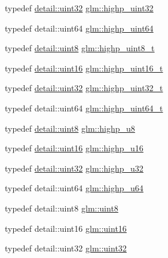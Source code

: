 \begin{DoxyCompactItemize}
\item 
typedef \hyperlink{stb__image_8c_a1134b580f8da4de94ca6b1de4d37975e}{detail\+::uint32} \hyperlink{group__gtc__type__precision_ga3145e44c73e2df7dfe4f3cb65974bf22}{glm\+::highp\+\_\+uint32}
\item 
typedef detail\+::uint64 \hyperlink{group__gtc__type__precision_ga8079c653e20cda03d34b99de629a7b09}{glm\+::highp\+\_\+uint64}
\item 
typedef \hyperlink{stb__image_8c_adde6aaee8457bee49c2a92621fe22b79}{detail\+::uint8} \hyperlink{group__gtc__type__precision_ga9ba529fcc75b82d23da979f0ce6e4518}{glm\+::highp\+\_\+uint8\+\_\+t}
\item 
typedef \hyperlink{stb__image_8c_a05f6b0ae8f6a6e135b0e290c25fe0e4e}{detail\+::uint16} \hyperlink{group__gtc__type__precision_ga3145bc0ee80432c165e985a188a722b3}{glm\+::highp\+\_\+uint16\+\_\+t}
\item 
typedef \hyperlink{stb__image_8c_a1134b580f8da4de94ca6b1de4d37975e}{detail\+::uint32} \hyperlink{group__gtc__type__precision_ga8eb85ad460079c63b68866ae34637bda}{glm\+::highp\+\_\+uint32\+\_\+t}
\item 
typedef detail\+::uint64 \hyperlink{group__gtc__type__precision_ga6e66f40c5909bfc872b068187fa6029e}{glm\+::highp\+\_\+uint64\+\_\+t}
\item 
typedef \hyperlink{stb__image_8c_adde6aaee8457bee49c2a92621fe22b79}{detail\+::uint8} \hyperlink{group__gtc__type__precision_ga8a60abe782749c504fb5ae51eb8b49cc}{glm\+::highp\+\_\+u8}
\item 
typedef \hyperlink{stb__image_8c_a05f6b0ae8f6a6e135b0e290c25fe0e4e}{detail\+::uint16} \hyperlink{group__gtc__type__precision_ga9da2178d7501d9c0f225fa1a7b70cb45}{glm\+::highp\+\_\+u16}
\item 
typedef \hyperlink{stb__image_8c_a1134b580f8da4de94ca6b1de4d37975e}{detail\+::uint32} \hyperlink{group__gtc__type__precision_gae8e8a2c712653891a03c171795286ac5}{glm\+::highp\+\_\+u32}
\item 
typedef detail\+::uint64 \hyperlink{group__gtc__type__precision_ga6006ea883d3c0491791650b2fb84de39}{glm\+::highp\+\_\+u64}
\item 
typedef detail\+::uint8 \hyperlink{group__gtc__type__precision_ga1a7dcd8aac97cc8020817c94049deff2}{glm\+::uint8}
\item 
typedef detail\+::uint16 \hyperlink{group__gtc__type__precision_gad8c2939e1fdd8e5828b31d95c52255d5}{glm\+::uint16}
\item 
typedef detail\+::uint32 \hyperlink{group__gtc__type__precision_ga202b6a53c105fcb7e531f9b443518451}{glm\+::uint32}

\end{DoxyCompactItemize}
